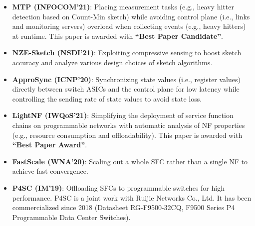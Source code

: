 \documentclass{resume}
\begin{document}
\begin{itemize}
  \item \textbf{MTP (INFOCOM'21)}: Placing measurement tasks (e.g., heavy hitter detection based on Count-Min sketch) while avoiding control plane (i.e., links and monitoring servers) overload when collecting events (e.g., heavy hitters) at runtime. This paper is awarded with \textbf{``Best Paper Candidate''}. 
  \item \textbf{NZE-Sketch (NSDI'21)}: Exploiting compressive sensing to boost sketch accuracy and analyze various design choices of sketch algorithms. 
  \item \textbf{ApproSync (ICNP'20)}: Synchronizing state values (i.e., register values) directly between switch ASICs and the control plane for low latency while controlling the sending rate of state values to avoid state loss.
\end{itemize}

\begin{itemize}
  \item \textbf{LightNF (IWQoS'21)}: Simplifying the deployment of service function chains on programmable networks with automatic analysis of NF properties (e.g., resource consumption and offloadability). This paper is awarded with \textbf{``Best Paper Award''}. 
  \item \textbf{FastScale (WNA'20)}: Scaling out a whole SFC rather than a single NF to achieve fast convergence. 
  \item \textbf{P4SC (IM'19)}: Offloading SFCs to programmable switches for high performance. P4SC is a joint work with Ruijie Networks Co., Ltd. It has been commercialized since 2018 (Datasheet RG-F9500-32CQ, F9500 Series P4 Programmable Data Center Switches).
\end{itemize}

\end{document}
